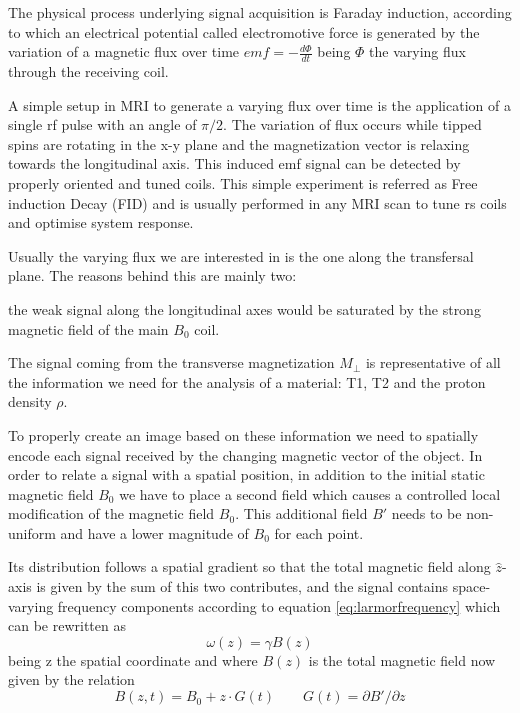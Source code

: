 \documentclass[11pt]{report}
\begin{document}
The physical process underlying signal acquisition is Faraday induction, according to which an electrical potential called electromotive force is generated by the variation of a magnetic flux over time $emf = -\frac{d\Phi}{dt}$ being $\Phi$ the varying flux through the receiving coil.

A simple setup in MRI to generate a varying flux over time is the application of a single rf pulse with an angle of $\pi/2$. The variation of flux occurs while tipped spins are rotating in the x-y plane and the magnetization vector is relaxing towards the longitudinal axis.
This induced emf signal can be detected by properly oriented and tuned coils. This simple experiment is referred as Free induction Decay (FID) and is usually performed in any MRI scan to tune rs coils and optimise system response.

Usually the varying flux we are interested in is the one along the transfersal plane. The reasons behind this are mainly two:
\begin{enumerate*}
\item the weak signal along the longitudinal axes would be saturated by the strong magnetic field of the main $B_0$ coil.
\item The signal coming from the transverse magnetization $M_\perp$ is representative of all the information we need for the analysis of a material: T1, T2 and the proton density $\rho$.
\end{enumerate*}

\hfill

To properly create an image based on these information we need to spatially encode each signal received by the changing magnetic vector of the object.
In order to relate a signal with a spatial position, in addition to the initial static magnetic field $B_0$ we have to place a second field which causes a controlled local modification of the magnetic field $B_0$. This additional field $B'$ needs to be non-uniform and have a lower magnitude of $B_0$ for each point.

Its distribution follows a spatial gradient so that the total magnetic field along $\hat z$-axis is given by the sum of this two contributes, and the signal contains space-varying frequency components according to equation \ref{eq:larmorfrequency} which can be rewritten as
\[
\omega(z) = \gamma B(z)
\]
being z the spatial coordinate and where $B(z)$ is the total magnetic field now given by the relation
\begin{equation}
B(z, t) = B_0 + z\cdot G(t) \qquad G(t) =\partial B'/\partial z
\end{equation}
\end{document}
